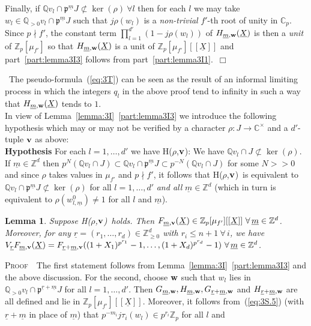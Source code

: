 \documentclass[12pt]{article}
\newtheorem{lemma}{Lemma}[section]
\newcounter{rem}[section]%
\newcommand{\bbC}{\ensuremath{\mathbb{C}}}
\newcommand{\bbQ}{\ensuremath{\mathbb{Q}}}
\newcommand{\bbZ}{\ensuremath{\mathbb{Z}}}
\newcommand{\bPf}{\noindent \textsc{Proof\ }}
\newcommand{\bv}{\ensuremath{{\bf v}}}
\newcommand{\bw}{\ensuremath{{\bf w}}}
\newcommand{\ePf}{\hspace*{\fill}~$\Box$\vertsp\par}%
\newcommand{\fp}{\ensuremath{\mathfrak{p}}}
\newcommand{\ndiv}{\nmid}
\newcommand{\refeq}[1]{~(\ref{eq:#1})}
\newcommand{\rem}{\refstepcounter{rem}\noindent{\sc Remark \therem}}%
\renewcommand{\therem}{\thesection.\arabic{rem}}
\newcommand{\vertsp}{\vspace{1ex}}
\newcommand{\Hrhov}{H($\rho$,$\bv$)}
\newcommand{\um}{\ensuremath{{\underline{m}}}}
\newcommand{\ur}{\ensuremath{{\underline{r}}}}
\newcommand{\uX}{\ensuremath{{\underline{X}}}}
\begin{document}
Finally, if  $\bbQ v_l\cap \fp^\um J\not\subset\ker(\rho)\ \forall l$
then for each $l$ we may take $w_l\in\bbQ_{>0} v_l\cap \fp^\um J$ such that
$j\rho(w_l)$ is a
\emph{non-trivial} $f'$-th root of unity in $\bbC_p$.
Since $p\ndiv f'$, the constant term
$\prod_{l=1}^{d'}(1-j\rho(w_l))$ of $H_{\um,\bw}(\uX)$
is then a \emph{unit} of $\bbZ_p[\mu_{f'}]$ so that
$H_{\um,\bw}(\uX)$ is a unit of $\bbZ_p[\mu_{f'}][[\uX]]$ and
part~\ref{part:lemma3I3} follows from part~\ref{part:lemma3I1}.\ePf
\rem\ The pseudo-formula\refeq{3T} can be seen as the result of an informal limiting process
in which the integers $q_l$ in the above proof tend to infinity in such a
way that $H_{\um,\bw}(\uX)$ tends to $1$.\vspace{1ex}\\
In view of Lemma~\ref{lemma:3I}~\ref{part:lemma3I3}
we introduce the following hypothesis which may or may not be verified by
a character $\rho:J\rightarrow\bbC^\times$
and a $d'$-tuple $\bv$ as above:
\vspace{1ex}\\
{\bf Hypothesis}
For each $l=1,\ldots,d'$ we have
H($\rho$,$\bv$): We have $\bbQ v_l\cap J\not\subset\ker(\rho)$.
\vspace{1ex}\\
If $\um\in\bbZ^d$ then
$p^N(\bbQ v_l\cap J)\subset \bbQ v_l\cap\fp^\um J\subset p^{-N}(\bbQ v_l\cap J)$ for
some $N>>0$ and since $\rho$ takes values in $\mu_{f'}$ and $p\ndiv f'$,
it follows that \Hrhov\ is equivalent
to $\bbQ v_l\cap \fp^\um J\not\subset\ker(\rho)$
for all $l=1,\ldots,d'$ \emph{and all} $\um\in\bbZ^d$
(which in turn is equivalent to
$\rho(w^0_{l,\um})\neq 1$ for all $l$ and $\um$).
\begin{lemma}\label{lemma:3I.5}
Suppose \Hrhov\ holds. Then
$F_{\um,\bv}(\uX)\in\bbZ_p[\mu_{f'}][[\uX]]\ \forall\,\um\in\bbZ^d$.
Moreover,
for any $\ur=(r_1,\ldots,r_d)\in\bbZ_{\geq 0}^d$ with
$r_i\leq n+1\ \forall\,i$, we have
$V_\ur F_{\um,\bv}(\uX)=
F_{\ur+\um,\bv}((1+X_1)^{p^{r_1}}-1,\ldots,(1+X_d)^{p^{r_d}}-1)
\ \forall\,\um\in\bbZ^d$.
\end{lemma}
\bPf\ The first statement follows from
Lemma~\ref{lemma:3I}~\ref{part:lemma3I3} and the above discussion. For the
second, choose $\bw$ such that $w_l$ lies in $\bbQ_{>0}v_l\cap
\fp^{\ur+\um}J$ for all $l=1,\ldots,d'$. Then
$G_{\um,\bw},H_{\um,\bw},G_{\ur+\um,\bw}$ and $H_{\ur+\um,\bw}$
are all defined and lie in $\bbZ_p[\mu_{f'}][[\uX]]$. Moreover,
it follows from\refeq{3S.5} (with $\ur+\um$ in place of $\um$)
that $p^{-m_i}j\tau_i(w_l)\in p^{r_i}\bbZ_p$ for all $l$ and
\end{document}
